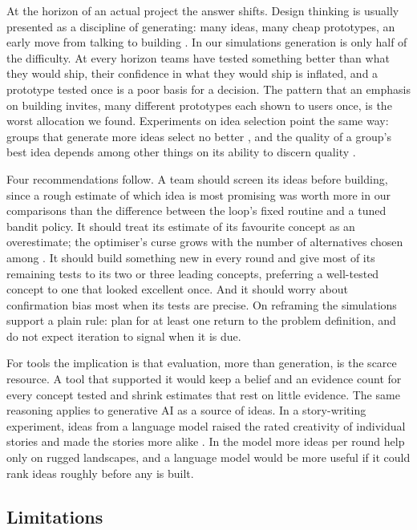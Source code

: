 \documentclass[preprint,review,11pt,authoryear]{elsarticle}
\theoremstyle{definition}
\begin{document}
At the horizon of an actual project the answer shifts. Design thinking is usually presented as a discipline of generating: many ideas, many cheap prototypes, an early move from talking to building \citep{brown2008, dschool2010}. In our simulations generation is only half of the difficulty. At every horizon teams have tested something better than what they would ship, their confidence in what they would ship is inflated, and a prototype tested once is a poor basis for a decision. The pattern that an emphasis on building invites, many different prototypes each shown to users once, is the worst allocation we found. Experiments on idea selection point the same way: groups that generate more ideas select no better \citep{rietzschel2006}, and the quality of a group's best idea depends among other things on its ability to discern quality \citep{girotra2010}.

Four recommendations follow. A team should screen its ideas before building, since a rough estimate of which idea is most promising was worth more in our comparisons than the difference between the loop's fixed routine and a tuned bandit policy. It should treat its estimate of its favourite concept as an overestimate; the optimiser's curse grows with the number of alternatives chosen among \citep{smithwinkler2006}. It should build something new in every round and give most of its remaining tests to its two or three leading concepts, preferring a well-tested concept to one that looked excellent once. And it should worry about confirmation bias most when its tests are precise. On reframing the simulations support a plain rule: plan for at least one return to the problem definition, and do not expect iteration to signal when it is due.

For tools the implication is that evaluation, more than generation, is the scarce resource. A tool that supported it would keep a belief and an evidence count for every concept tested and shrink estimates that rest on little evidence. The same reasoning applies to generative AI as a source of ideas. In a story-writing experiment, ideas from a language model raised the rated creativity of individual stories and made the stories more alike \citep{doshi2024}. In the model more ideas per round help only on rugged landscapes, and a language model would be more useful if it could rank ideas roughly before any is built.

\FloatBarrier
\subsection{Limitations}
\end{document}

